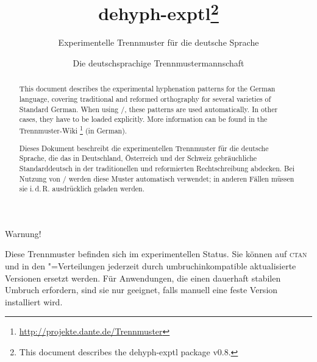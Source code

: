 \documentclass[11pt,
               DIV=9,
               toc=flat,
               captions=tableheading,
               abstract=on]{scrartcl}
\newcommand*{\Abk}[1]{\mbox{\textsc{\lsstyle#1}}}
\newcommand*{\Paket}[1]{\textsf{#1}}
\begin{document}


\author{Die deutschsprachige Trennmustermannschaft}
\title{\Paket{dehyph-exptl}\thanks{This document describes the
    \Paket{dehyph-exptl} package v0.8.}}
\subtitle{Experimentelle Trennmuster für die deutsche Sprache}
\maketitle

\begin{abstract}
  This document describes the experimental hyphenation patterns for
  the German language, covering traditional and reformed orthography
  for several varieties of Standard German.  When using
  /, these patterns are used
  automatically.  In other cases, they have to be loaded explicitly.
  More information can be found in the Trennmuster-Wiki%
  \footnote{\url{http://projekte.dante.de/Trennmuster}} (in German).
\end{abstract}

\begin{abstract}
  Dieses Dokument beschreibt die experimentellen Trennmuster für die
  deutsche Sprache, die das in Deutschland, Österreich und der Schweiz
  gebräuchliche Standarddeutsch in der traditionellen und reformierten
  Rechtschreibung abdecken.  Bei Nutzung von
  / werden diese Muster automatisch
  verwendet; in anderen Fällen müssen sie i.\,d.\,R. ausdrücklich
  geladen werden.
\end{abstract}

\vfill
\begingroup
\em\large

\begin{center}
  Warnung!
\end{center}

Diese Trennmuster befinden sich im experimentellen Status.  Sie können
auf \Abk{ctan} und in den "=Verteilungen jederzeit
durch umbruchinkompatible aktualisierte Versionen ersetzt werden.  Für
Anwendungen, die einen dauerhaft stabilen Umbruch erfordern, sind sie
nur geeignet, falls manuell eine feste Version installiert wird.
\endgroup \vfill
\end{document}
